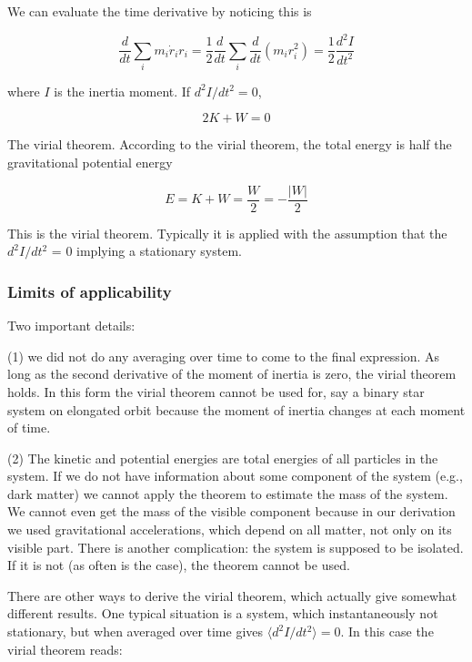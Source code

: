 We can evaluate the time derivative by noticing this is 

\begin{equation}
\frac{d}{dt}\sum_i m_i \dot{r}_i r_i = \frac{1}{2}\frac{d}{dt}\sum_i
\frac{d}{dt} \left( m_i r_i^2\right) = \frac{1}{2}\frac{d^2 I}{dt^2}
\end{equation}

where $I$ is the inertia moment. If $d^2I/dt^2=0$, 

\begin{equation}
2K + W = 0 
\label{eq:virial}
\end{equation}

The virial theorem. According to the virial theorem, the total energy
is half the gravitational potential energy


\begin{equation}
E = K + W = \frac{W}{2} = -\frac{|W|}{2}
\end{equation}


This is the virial theorem. Typically it is applied with the assumption that the $d^2I/dt^2$ = 0
implying a stationary system.


\subsubsection{Limits of applicability}

Two important details: 

(1) we did not do any averaging over time to come to the final expression. As long as the second derivative of the moment of inertia is zero, the virial theorem holds. In this form the virial theorem cannot be used for, say a binary star system on elongated orbit because the moment of inertia changes at each moment of time. 

(2) The kinetic and potential energies are total energies of all particles in the system. If we do not have information about some component of the system (e.g., dark matter) we cannot apply the theorem to estimate the mass of the system. We cannot even get the mass of the visible component because in our derivation we used gravitational accelerations, which depend on all matter, not only on its visible part. There is another complication: the system is supposed to be isolated. If it is not (as often is the case), the theorem cannot be used.

There are other ways to derive the virial theorem, which actually give somewhat different results. One typical situation is a system, which instantaneously not stationary, but when averaged over time gives $\langle d^2I/dt^2\rangle = 0$. In this case the virial theorem reads:

